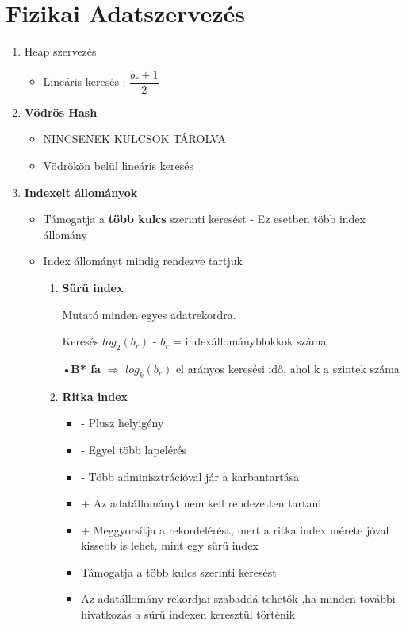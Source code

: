 
\section{Fizikai Adatszervezés}

	\begin{enumerate}
		\item Heap szervezés
			\begin{itemize}
				\item Lineáris keresés : $\dfrac{b_r + 1}{2}$
			\end{itemize}

		\item \textbf{Vödrös Hash}
			\begin{itemize}
				\item NINCSENEK KULCSOK TÁROLVA
				\item Vödrökön belül lineáris keresés
			\end{itemize}

		\item \textbf{Indexelt állományok}

			\begin{itemize}
				\item	Támogatja a \textbf{több kulcs} szerinti keresést - Ez esetben több index állomány

				\item Index állományt mindig rendezve tartjuk

				\begin{enumerate}
					\item \textbf{Sűrű index}

							Mutató minden egyes adatrekordra.

							Keresés $log_2(b_r)$ - $b_r$ = indexállományblokkok száma

							\forceindent •\textbf{B* fa} $\Longrightarrow$ $log_k(b_r)$ el arányos keresési idő, ahol k a szintek száma


					\item \textbf{Ritka index}

							\begin{itemize}
								\item - Plusz helyigény
								\item - Egyel több lapelérés
								\item - Több adminisztrációval jár a karbantartása
								\item + Az adatállományt nem kell rendezetten tartani
								\item + Meggyorsítja a rekordelérést, mert a ritka index mérete jóval kissebb is lehet, mint egy sűrű index
								\item Támogatja a több kulcs szerinti keresést
								\item Az adatállomány rekordjai szabaddá tehetők ,ha minden további hivatkozás a sűrű indexen keresztül történik
							\end{itemize}
				\end{enumerate}
			\end{itemize}
	\end{enumerate}
